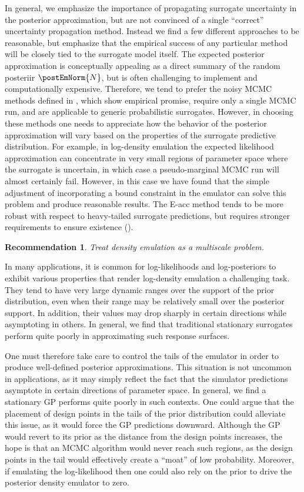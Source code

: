 \documentclass[12pt]{article}
\newtheorem{rec}{Recommendation}
\begin{document}
In general, we emphasize the importance of propagating surrogate uncertainty in 
the posterior approximation, but are not convinced of a single ``correct'' uncertainty 
propagation method. Instead we find a few different approaches to be reasonable, but
emphasize that the empirical success of any particular method will be closely tied to the
surrogate model itself. The expected posterior approximation is conceptually appealing
as a direct summary of the random posteriir $\postEmNorm{\Ndesign}$, but is often 
challenging to implement and computationally expensive. 
Therefore, we tend to prefer the noisy MCMC methods defined in ,
which show empirical promise, require only a single MCMC run, and are applicable to 
generic probabilistic surrogates.
However, in choosing these methods one needs to appreciate how the behavior of the posterior
approximation will vary based on the properties of the surrogate predictive distribution.
For example, in log-density emulation the expected likelihood approximation can concentrate in very 
small regions of parameter space where the surrogate is uncertain, in which case a pseudo-marginal 
MCMC run will almost certainly fail. However, in this case we have found that the simple adjustment 
of incorporating a bound constraint in the emulator can solve this problem and produce reasonable 
results. The E-acc method tends to be more robust with respect to 
heavy-tailed surrogate predictions, but requires stronger requirements to ensure 
existence (). 

\begin{rec} \label{rec:multiscale}
Treat density emulation as a multiscale problem.
\end{rec}

In many applications, it is common for log-likelihoods and log-posteriors to exhibit various
properties that render log-density emulation a challenging task. They tend to have very 
large dynamic ranges over the support of the prior distribution, even when their range 
may be relatively small over the posterior support. In addition, their values may drop sharply 
in certain directions while asymptoting in others. In general, we find that traditional stationary 
surrogates perform quite poorly in approximating such response surfaces. 



One must therefore take care to control the tails of the emulator in order to produce well-defined
posterior approximations. This situation is not uncommon in applications, as it may simply reflect the 
fact that the simulator predictions asymptote in certain directions of parameter space. 
In general, we find a stationary GP performs quite poorly in such contexts. One could argue that 
the placement of design points in the tails of the prior distribution could alleviate this issue, 
as it would force the GP predictions downward. Although the GP would revert to its prior
as the distance from the design points increases, the hope is  
that an MCMC algorithm would never reach such regions, as the design points in the tail
would effectively create a ``moat'' of low probability.
Moreover, if emulating the log-likelihood then one could also rely on the prior to drive the posterior 
density emulator to zero.
\end{document}
